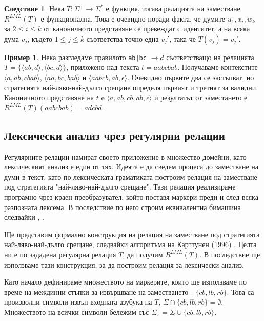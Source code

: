 \documentclass[12pt, oneside]{article}
\theoremstyle{definition}
\newtheorem{example}{Пример}[section]
\newtheorem{corollary}{Следствие}[section]
\begin{document}
\begin{corollary}
	Нека \( T: \Sigma^+ \to \Sigma^* \) е функция, тогава релацията на заместване \( R^{LML}(T) \) е функционална. Това е очевидно поради факта, че думите \(u_1, x_i, w_k \) за \( 2 \le i \le k \) от каноничното представяне се превеждат с идентитет, а на всяка дума \( v_j \), където \( 1 \le j \le k \) съответства точно една \( v_j' \), така че \( T(v_j) = v_j' \).
\end{corollary}

\begin{example}
	Нека разгледаме правилото \verb/ab|bc/ \( \to d \) съответстващо на релацията \(T = \{ \langle ab,d \rangle, \langle bc, d \rangle \} \), приложено над текста \( t = aabcbab \). Получаваме контекстите \( \langle a, ab, cbab \rangle \), \( \langle aa, bc, bab \rangle \) и \( \langle aabcb, ab, \epsilon \rangle \). Очевидно първите два се застъпват, но стратегията най-ляво-най-дълго срещане определя първият и третият за валидни. Каноничното представяне на \(t \) e \( \langle a, ab, cb, ab, \epsilon  \rangle \) и резултатът от заместането е \( R^{LML}(T)(aabcbab) = adcbd \).
\end{example}

\pagebreak
\subsection{Лексически анализ чрез регулярни релации}
\label{sec:LexARegRel}
Регулярните релации намират своето приложение в множество домейни, като лексическият анализ е един от тях. Идеята е да сведем процеса до заместване на думи в текст, като по лексическата граматиката построим релация на заместване под стратегията "най-ляво-най-дълго срещане". Тази релация реализираме програмно чрез краен преобразувател, който поставя маркери преди и след всяка разпозната лексема. В последствие по него строим еквивалентна бимашина следвайки \cite{GerdjikovEtAl:2017}, \cite{Mihov:2018-2}.

Ще представим формално конструкция на релация на заместване под стратегията най-ляво-най-дълго срещане, следвайки алгоритъма на Карттунен (1996) \cite{Karttunen:96}. Целта ни е по зададена регулярна релация \(T\), да получим \( R^{LML}(T) \). В последствие ще използваме тази конструкция, за да построим релация за лексически анализ.

Като начало дефинираме множеството на маркерите, които ще използваме по време на междинни стъпки за извършване на заместването - \( \{ cb, lb, rb \} \). Това са произволни символи извън входната азубука на \(T\), \( \Sigma \cap \{ cb, lb, rb \} = \emptyset \). Множеството на всички символи бележим със \( \Sigma_x = \Sigma \cup \{ cb, lb, rb \} \). 
\end{document}
